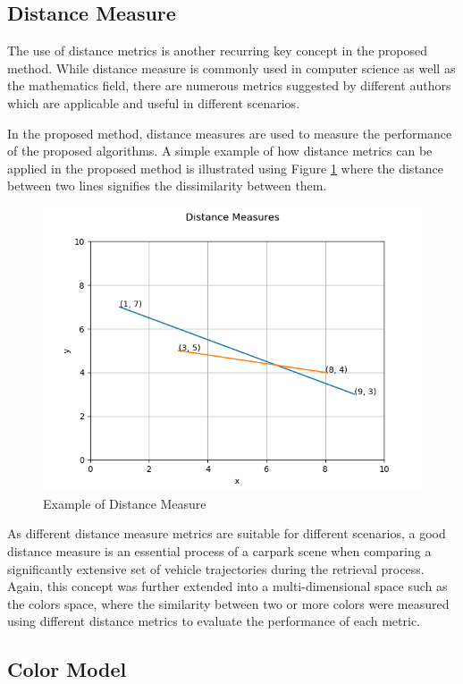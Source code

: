 \subsection{Distance Measure}
\label{section:distancemeasures}

The use of distance metrics is another recurring key concept in the proposed method. While distance measure is commonly used in computer science as well as the mathematics field, there are numerous metrics suggested by different authors which are applicable and useful in different scenarios.   

In the proposed method, distance measures are used to measure the performance of the proposed algorithms. A simple example of how distance metrics can be applied in the proposed method is illustrated using Figure \ref{fig:distanceMeasure} where the distance between two lines signifies the dissimilarity between them. 



\begin{figure}[hbt!]\centering
\includegraphics[width=.7\textwidth]{image/general/distance.png}
\caption{Example of Distance Measure}
\label{fig:distanceMeasure}
\end{figure}

As different distance measure metrics are suitable for different scenarios, a good distance measure is an essential process of a carpark scene when comparing a significantly extensive set of vehicle trajectories during the retrieval process.   
Again, this concept was further extended into a multi-dimensional space such as the colors space, where the similarity between two or more colors were measured using different distance metrics to evaluate the performance of each metric. 



\subsection{Color Model}


